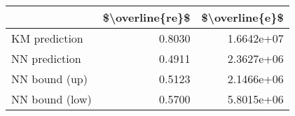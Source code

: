 \begin{tabular}{lrr}
\toprule
{} &  \$\textbackslash overline\{re\}\$ &  \$\textbackslash overline\{e\}\$ \\
\midrule
KM prediction  &           0.8030 &      1.6642e+07 \\
NN prediction  &           0.4911 &      2.3627e+06 \\
NN bound (up)  &           0.5123 &      2.1466e+06 \\
NN bound (low) &           0.5700 &      5.8015e+06 \\
\bottomrule
\end{tabular}
